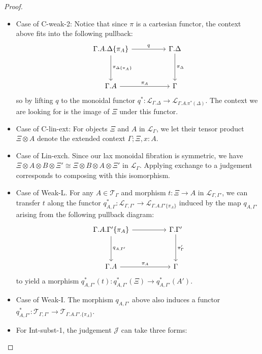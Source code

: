 \begin{thm}
\begin{proof}
\begin{itemize}
\item Case of C-weak-2: Notice that since $\pi$ is a cartesian functor, the context above fits into the following pullback:
\[
\ti
\Gamma.A.\Delta\{\pi_A\} \ar[r, "q"] \ar[d, "\pi_{\Delta\{\pi_A\}}"]  & \Gamma.\Delta \ar[d, "\pi_\Delta"]\\
\Gamma.A \ar[r, "\pi_A"] & \Gamma
\kz
\]
so by lifting $q$ to the monoidal functor $q^* : \mathcal{L}_{\Gamma.\Delta} \to \mathcal{L}_{\Gamma.A.\pi^*(\Delta)}$. The context we are looking for is the image of $\Xi$ under this functor.
\item Case of C-lin-ext: For objects $\Xi$ and $A$ in $\mathcal{L}_{\Gamma}$, we let their tensor product $\Xi \otimes A$ denote the extended context $\Gamma; \Xi, x : A$.
\item Case of Lin-exch. Since our lax monoidal fibration is symmetric, we have $\Xi \otimes A \otimes B \otimes \Xi' \cong \Xi \otimes B \otimes A \otimes \Xi'$ in $\mathcal{L}_{\Gamma}$. Applying exchange to a judgement corresponds to composing with this isomorphism.
\item Case of Weak-L. For any $A \in \mathcal{T}_{\Gamma}$ and morphism $t : \Xi \to A$ in $\mathcal{L}_{\Gamma, \Gamma'}$, we can transfer $t$ along the functor $q_{A, \Gamma}^* : \mathcal{L}_{\Gamma, \Gamma'} \to \mathcal{L}_{\Gamma.A.\Gamma'\{\pi_A\}}$ induced by the map $q_{A, \Gamma'}$ arising from the following pullback diagram:
\[
\ti
\Gamma.A.\Gamma'\{\pi_A\} \ar[r] \ar[d, "q_{A, \Gamma'}"]  & \Gamma.\Gamma' \ar[d, "\pi_\Gamma'"]\\
\Gamma.A \ar[r, "\pi_A"] & \Gamma
\kz
\]
to yield a morphism $q_{A, \Gamma'}^*(t) : q_{A, \Gamma'}^*(\Xi) \to q_{A, \Gamma'}^*(A')$.
\item Case of Weak-I. The morphism $q_{A, \Gamma'}$ above also induces a functor $q_{A, \Gamma'}^* : \mathcal{T}_{\Gamma, \Gamma'} \to \mathcal{T}_{\Gamma.A.\Gamma'.\{\pi_A\}}$.
\item For Int-subst-1, the judgement $\mathcal{J}$ can take three forms:

\end{itemize}
\end{proof}
\end{thm}

